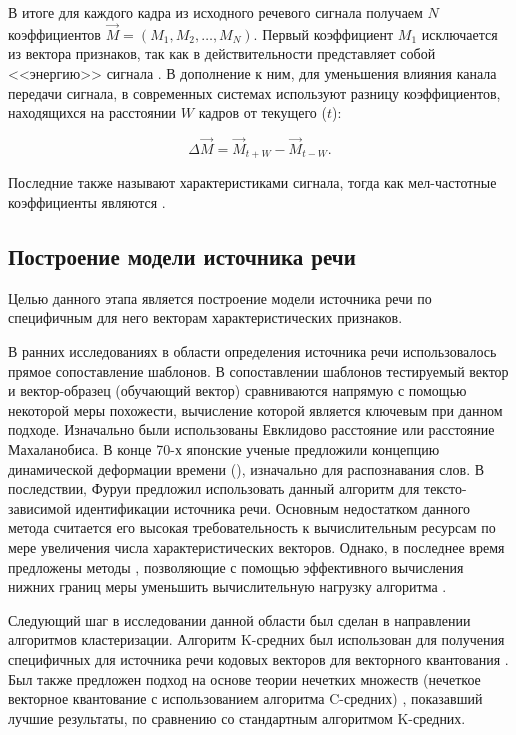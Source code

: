 В итоге для каждого кадра из исходного речевого сигнала получаем $N$ коэффициентов $\vec M = (M_1, M_2, \ldots, M_N)$. Первый коэффициент $M_1$ исключается из вектора признаков, так как в действительности представляет собой <<энергию>> сигнала \cite{Reynolds95gmm}. В дополнение к ним, для уменьшения влияния канала передачи сигнала, в современных системах используют \cite{Reynolds95gmm} разницу коэффициентов, находящихся на расстоянии $W$ кадров от текущего ($t$):

\begin{equation}
\label{eq:deltamfcc}
\Delta \vec M = \vec M_{t+W} - \vec M_{t-W}.
\end{equation}

Последние также называют  характеристиками сигнала, тогда как мел-частотные коэффициенты являются .

\subsection{Построение модели источника речи}

Целью данного этапа является построение модели источника речи по специфичным для него векторам характеристических признаков.

В ранних исследованиях в области определения источника речи использовалось прямое сопоставление шаблонов. В сопоставлении шаблонов тестируемый вектор и вектор-образец (обучающий вектор) сравниваются напрямую с помощью некоторой меры похожести, вычисление которой является ключевым при данном подходе. Изначально были использованы Евклидово расстояние или расстояние Махаланобиса. В конце 70-х японские ученые предложили \cite{Sakoe78DTW} концепцию динамической деформации времени (), изначально для распознавания слов. В последствии, Фуруи \cite{Furui81cepstral} предложил использовать данный алгоритм для тексто-зависимой идентификации источника речи. Основным недостатком данного метода считается его высокая требовательность к вычислительным ресурсам по мере увеличения числа характеристических векторов. Однако, в последнее время предложены методы \cite{Lemire09dtw}, позволяющие с помощью эффективного вычисления нижних границ меры уменьшить вычислительную нагрузку алгоритма .

Следующий шаг в исследовании данной области был сделан в направлении алгоритмов кластеризации. Алгоритм K-средних был использован для получения специфичных для источника речи кодовых векторов для векторного квантования \cite{Soong85VQ}. Был также предложен подход на основе теории нечетких множеств (нечеткое векторное квантование с использованием алгоритма C-средних) \cite{Bezdek78FVQ}, показавший лучшие результаты, по сравнению со стандартным алгоритмом K-средних.


